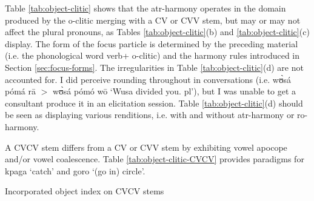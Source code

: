 \begin{exe}
\begin{exe}
\begin{exe}
{\begin{exe}
\begin{exe}
\begin{exe}
\begin{exe}
\begin{exe}
\begin{exe}
\begin{exe}
\begin{exe}
\begin{exe}
\begin{exe}
\begin{exe}
\begin{exe}
\begin{exe}
\begin{exe}
\begin{exe}
\begin{exe}
\begin{exe}
\begin{exe}
\begin{exe}
\begin{exe}
\begin{exe}
Table \ref{tab:object-clitic} shows that the {\sc atr}-harmony 
operates in the domain produced by the {\sc
o}-clitic merging with a CV or CVV stem, but may or may not affect the
plural pronouns, as Tables \ref{tab:object-clitic}(b) and 
\ref{tab:object-clitic}(c) display. The form of the focus particle is determined
by
the preceding material (i.e. the phonological word  verb+{\sc
o}-clitic) and the harmony rules introduced in
Section
\ref{sec:focus-forms}.  The irregularities in Table \ref{tab:object-clitic}(d)
are not accounted for.  I did perceive rounding throughout in conversations
(i.e.  {\sls wʊ̀sá pómá rā} $>$ {\sls wʊ̀sá pómó wō} `Wusa divided you.{\sc 
pl}'), 
but
I was unable to get a consultant  produce it in an elicitation session. Table
\ref{tab:object-clitic}(d) should be seen as displaying various renditions,
i.e. with and without {\sc atr-}harmony or {\sc ro-}harmony.


A CVCV stem differs from a CV or CVV stem by exhibiting vowel apocope and/or 
vowel
coalescence.  Table \ref{tab:object-clitic-CVCV} provides paradigms for {\sls 
kpaga} `catch' and {\sls goro} `(go in) circle'. 



\begin{table}[!htb]
\centering
\caption{Incorporated object index on  CVCV stems
\label{tab:object-clitic-CVCV}}


\end{table}
\end{exe}
\end{exe}
\end{exe}
\end{exe}
\end{exe}
\end{exe}
\end{exe}
\end{exe}
\end{exe}
\end{exe}
\end{exe}
\end{exe}
\end{exe}
\end{exe}
\end{exe}
\end{exe}
\end{exe}
\end{exe}
\end{exe}
\end{exe}
\end{exe}}
\end{exe}
\end{exe}
\end{exe}
